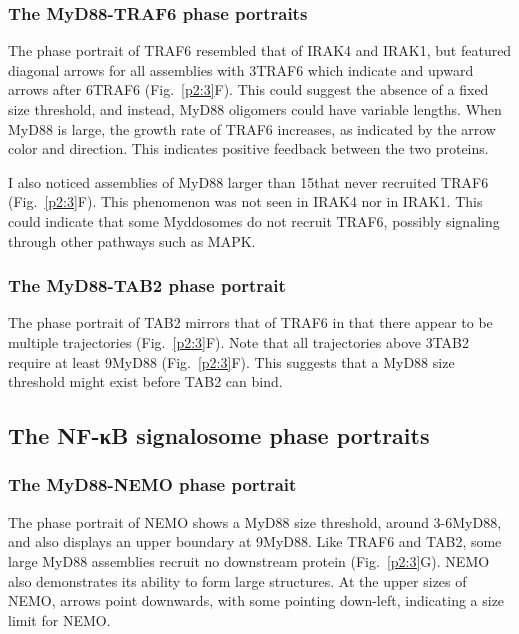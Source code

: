\subsubsection{The MyD88-TRAF6 phase portraits}
The phase portrait of TRAF6 resembled that of IRAK4 and IRAK1, but featured diagonal arrows for all assemblies with 3\times TRAF6 which indicate and upward arrows after 6\times TRAF6 (Fig.~\ref{p2:3}F). This could suggest the absence of a fixed size threshold, and instead, MyD88 oligomers could have variable lengths. When MyD88 is large, the growth rate of TRAF6 increases, as indicated by the arrow color and direction. This indicates positive feedback between the two proteins.

I also noticed assemblies of MyD88 larger than 15\times that never recruited TRAF6 (Fig.~\ref{p2:3}F). This phenomenon was not seen in IRAK4 nor in IRAK1. This could indicate that some Myddosomes do not recruit TRAF6, possibly signaling through other pathways such as MAPK.

\subsubsection{The MyD88-TAB2 phase portrait}
The phase portrait of TAB2 mirrors that of TRAF6 in that there appear to be multiple trajectories (Fig.~\ref{p2:3}F). Note that all trajectories above 3\times TAB2 require at least 9\times MyD88 (Fig.~\ref{p2:3}F). This suggests that a MyD88 size threshold might exist before TAB2 can bind.

\subsection{The NF-κB signalosome phase portraits}
\subsubsection{The MyD88-NEMO phase portrait}
The phase portrait of NEMO shows a MyD88 size threshold, around 3-6\times MyD88, and also displays an upper boundary at 9\times MyD88. Like TRAF6 and TAB2, some large MyD88 assemblies recruit no downstream protein (Fig.~\ref{p2:3}G). NEMO also demonstrates its ability to form large structures. At the upper sizes of NEMO, arrows point downwards, with some pointing down-left, indicating a size limit for NEMO.


